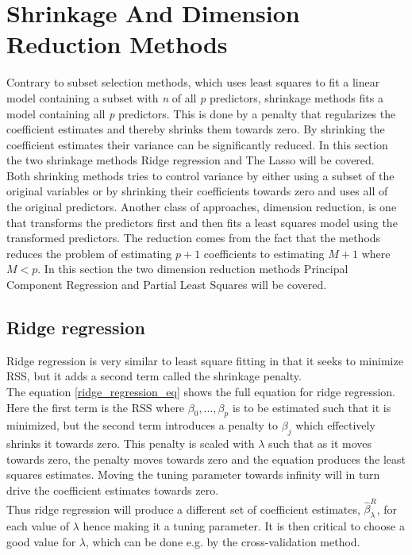 \graphicspath{{Chapters/Indledning/}}

\chapter{Shrinkage And Dimension Reduction Methods }
Contrary to subset selection methods, which uses least squares to fit a linear model containing a subset with \emph{n} of all \emph{p} predictors, shrinkage methods fits a model containing all \emph{p} predictors. This is done by a penalty that regularizes the coefficient estimates and thereby shrinks them towards zero. By shrinking the coefficient estimates their variance can be significantly reduced. In this section the two shrinkage methods Ridge regression and The Lasso will be covered.\\
Both shrinking methods tries to control variance by either using a subset of the original variables or by shrinking their coefficients towards zero and uses all of the original predictors. Another class of approaches, dimension reduction, is one that transforms the predictors first and then fits a least squares model using the transformed predictors. The reduction comes from the fact that the methods reduces the problem of estimating \(p+1\) coefficients to estimating \(M+1\) where \(M < p\). In this section the two dimension reduction methods Principal Component Regression and Partial Least Squares will be covered.


\section{Ridge regression}
Ridge regression is very similar to least square fitting in that it seeks to minimize RSS, but it adds a second term called the shrinkage penalty.\\ 
The equation \ref{ridge_regression_eq} shows the full equation for ridge regression. Here the first term is the RSS where \(\beta_0,...,\beta_p\) is to be estimated such that it is minimized, but the second term introduces a penalty to \(\beta_j\) which effectively shrinks it towards zero. This penalty is scaled with \(\lambda\) such that as it moves towards zero, the penalty moves towards zero and the equation produces the least squares estimates. Moving the tuning parameter towards infinity will in turn drive the coefficient estimates towards zero.\\ 
Thus ridge regression will produce a different set of coefficient estimates, \(\hat{\beta}_{\lambda}^{R}\), for each value of \(\lambda\) hence making it a tuning parameter. It is then critical to choose a good value for \(\lambda\), which can be done e.g. by the cross-validation method.

